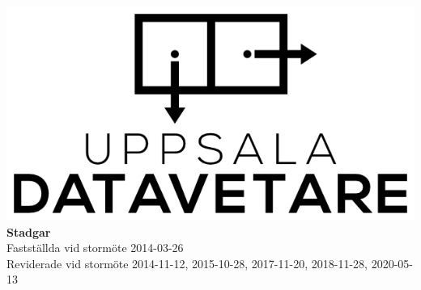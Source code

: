 \documentclass[a4paper]{article}
\begin{document}
\begin{titlepage}
  \vspace*{\fill}
  \centering
  \vfill
  \vfill
  \includegraphics[width=\textwidth]{UD_center.png}
  {\huge\textbf{Stadgar}\\
    \vspace{0.3em}
    \large{Fastställda vid stormöte 2014-03-26\\
      Reviderade vid stormöte 2014-11-12, 2015-10-28, 2017-11-20, 2018-11-28, 2020-05-13}}
  \vfill
  \vfill
  \vspace*{\fill}
\end{titlepage}
\renewcommand{\contentsname}{Innehåll\hfill\small Sida}
\tableofcontents
\cleardoublepage 
\setcounter{page}{1}
\cfoot{\thepage}
\end{document}
